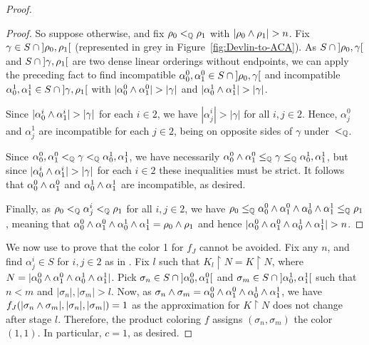 \begin{proof}
\begin{proof}
  		So suppose otherwise, and fix $\rho_0 <_{\mathbb{Q}} \rho_1$ with $|\rho_0\meet\rho_1|>n$. Fix $\gamma\in S\cap\interval[open]{\rho_0}{\rho_1}$ (represented in grey in Figure~\ref{fig:Devlin-to-ACA}). As $S\cap\interval[open]{\rho_0}\gamma$ and $S\cap\interval[open]\gamma{\rho_1}$ are two dense linear orderings without endpoints, we can apply the preceding fact to find incompatible $\alpha^0_{0},\alpha^0_{1}\in S\cap\interval[open]{\rho_0}\gamma$ and incompatible $\alpha^1_{0},\alpha^1_{1}\in S\cap\interval[open]\gamma{\rho_1}$ with $|\alpha^0_0\meet\alpha^0_1|>|\gamma|$ and $|\alpha^1_0\wedge\alpha^1_1| > |\gamma|$.

  		Since $|\alpha^i_0\wedge\alpha^i_1| > |\gamma|$ for each $i \in 2$, we have  $|\alpha^i_j| > |\gamma|$ for all $i,j \in 2$. Hence, $\alpha^0_j$ and $\alpha^1_j$ are incompatible for each $j \in 2$, being on opposite sides of $\gamma$ under~$<_{\mathbb{Q}}$.

  		Since $\alpha^0_0,\alpha^0_1 <_{\mathbb{Q}} \gamma <_{\mathbb{Q}} \alpha^1_0,\alpha^1_1$, we have necessarily $\alpha^0_0\wedge\alpha^0_1 \leq_{\mathbb{Q}} \gamma \leq_{\mathbb{Q}} \alpha^1_0,\alpha^1_1$, but since $|\alpha^i_0\wedge\alpha^i_1| > |\gamma|$ for each $i \in 2$ these inequalities must be strict. It follows that $\alpha^0_0\wedge\alpha^0_1$ and $\alpha^1_0\wedge\alpha^1_1$ are incompatible, as desired.

  		Finally, as $\rho_0 <_{\mathbb{Q}} \alpha^i_j <_{\mathbb{Q}} \rho_1$ for all $i,j \in 2$, we have $\rho_0 \leq_{\mathbb{Q}} \alpha^0_{0}\wedge\alpha^0_{1}\wedge\alpha^1_{0}\wedge\alpha^1_{1} \leq_{\mathbb{Q}} \rho_1$, meaning that $\alpha^0_{0}\wedge\alpha^0_{1}\wedge\alpha^1_{0}\wedge\alpha^1_{1} = \rho_0 \wedge \rho_1$ and hence $|\alpha^0_{0}\meet\alpha^0_{1}\meet\alpha^1_{0}\meet\alpha^1_{1}|>n$.
  \end{proof}

  We now use  to prove that the color 1 for $f_J$ cannot be avoided. Fix any $n$, and find $\alpha^i_j \in S$ for $i,j\in 2$ as in . Fix $l$ such that $K_l\upharpoonright N= K\upharpoonright N$, where $N=|\alpha^0_0\wedge\alpha^0_1\wedge\alpha^1_0\wedge\alpha^1_1|$. Pick $\sigma_n\in S\cap\interval[open]{\alpha^0_{0}}{\alpha^0_{1}}$ and $\sigma_m\in S\cap\interval[open]{\alpha^1_{0}}{\alpha^1_{1}}$ such that $n<m$ and $|\sigma_n|,|\sigma_m|>l$.
  Now, as $\sigma_n\wedge\sigma_m=\alpha^0_0\wedge\alpha^0_1\wedge\alpha^1_0\wedge\alpha^1_1$, we have $f_J(|\sigma_n\wedge\sigma_m|, |\sigma_n|,|\sigma_m|) = 1$ as the approximation for $K\upharpoonright N$ does not change after stage $l$. Therefore, the product coloring $f$ assigns $(\sigma_n,\sigma_m)$ the color $(1,1)$. In particular, $c = 1$, as desired.


\end{proof}
